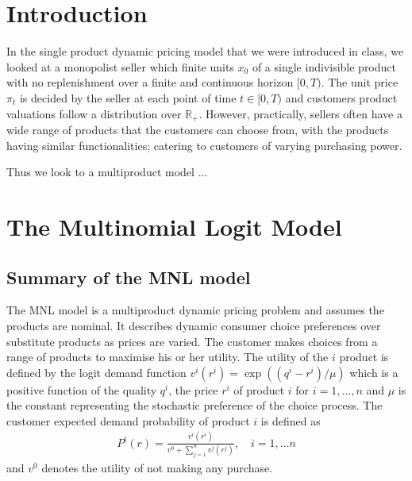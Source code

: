 


\section{Introduction}

In the single product dynamic pricing model that we were introduced in class, we looked at a monopolist seller which finite units $x_0$ of a single indivisible product with no replenishment over a finite and continuous horizon $[0,T)$. The unit price $\pi_t$ is decided by the seller at each point of time $t \in [0,T)$ and customers product valuations follow a distribution over $\mathbb{R}_+$. However, practically, sellers often have a wide range of products that the customers can choose from, with the products having similar functionalities; catering to customers of varying purchasing power.

Thus we look to a multiproduct model \cite{Li2009}...







\section{The Multinomial Logit Model}


\subsection{Summary of the MNL model}
The MNL model is a multiproduct dynamic pricing problem and assumes the products are nominal. It describes dynamic consumer choice preferences over substitute products as prices are varied. The customer makes choices from a range of products to maximise his or her utility. The utility of the $i$ product is defined by the logit demand function $v^i(r^i) = \exp ((q^i-r^i)/\mu)$ which is a positive function of the quality $q^i$, the price $r^i$ of product $i$ for $i=1,\ldots, n$ and $\mu$ is the constant representing the stochastic preference of the choice process. The customer expected demand probability of product $i$ is defined as 
\begin{align}
P^i(r) = \frac{v^i(r^i)}{v^0+\sum_{j=1}^{n}v^j(r^j)},\quad i = 1, \ldots n\label{eq:expecteddemandprob}
\end{align}
and $v^0$ denotes the utility of not making any purchase.


